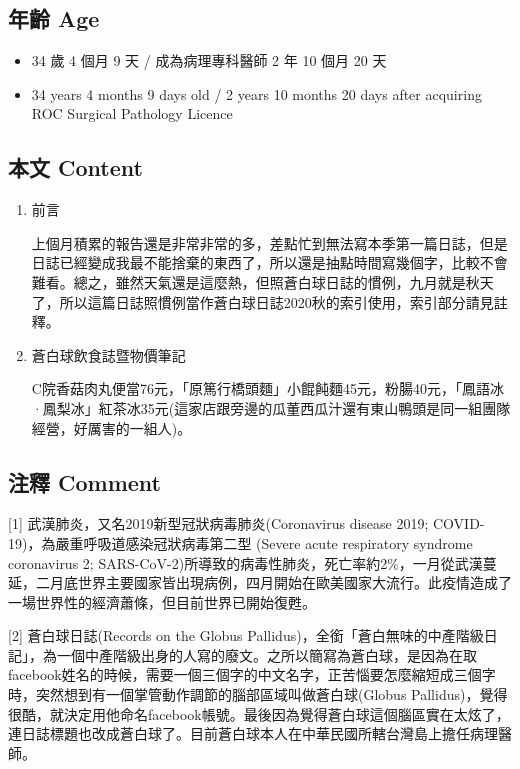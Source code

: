 \documentclass[a5paper, 11pt
]{book}
\providecommand{\tightlist}{%
  \setlength{\itemsep}{0pt}\setlength{\parskip}{0pt}}
\begin{document}
\hypertarget{ux5e74ux9f61-age}{%
\subsection{年齡 Age}\label{ux5e74ux9f61-age}}

\begin{itemize}
\tightlist
\item
  34 歲 4 個月 9 天 / 成為病理專科醫師 2 年 10 個月 20 天
\item
  34 years 4 months 9 days old / 2 years 10 months 20 days after
  acquiring ROC Surgical Pathology Licence
\end{itemize}

\hypertarget{ux672cux6587-content}{%
\subsection{本文 Content}\label{ux672cux6587-content}}

\begin{enumerate}
\def\labelenumi{\arabic{enumi}.}
\item
  前言

  上個月積累的報告還是非常非常的多，差點忙到無法寫本季第一篇日誌，但是日誌已經變成我最不能捨棄的東西了，所以還是抽點時間寫幾個字，比較不會難看。總之，雖然天氣還是這麼熱，但照蒼白球日誌的慣例，九月就是秋天了，所以這篇日誌照慣例當作蒼白球日誌2020秋的索引使用，索引部分請見註釋。
\item
  蒼白球飲食誌暨物價筆記

  C院香菇肉丸便當76元，「原篤行橋頭麵」小餛飩麵45元，粉腸40元，「鳳語冰·鳳梨冰」紅茶冰35元(這家店跟旁邊的瓜董西瓜汁還有東山鴨頭是同一組團隊經營，好厲害的一組人)。
\end{enumerate}

\hypertarget{ux6ce8ux91cb-comment}{%
\subsection{注釋 Comment}\label{ux6ce8ux91cb-comment}}

{[}1{]} 武漢肺炎，又名2019新型冠狀病毒肺炎(Coronavirus disease 2019;
COVID-19)，為嚴重呼吸道感染冠狀病毒第二型 (Severe acute respiratory
syndrome coronavirus 2;
SARS-CoV-2)所導致的病毒性肺炎，死亡率約2\%，一月從武漢蔓延，二月底世界主要國家皆出現病例，四月開始在歐美國家大流行。此疫情造成了一場世界性的經濟蕭條，但目前世界已開始復甦。

{[}2{]} 蒼白球日誌(Records on the Globus
Pallidus)，全銜「蒼白無味的中產階級日記」，為一個中產階級出身的人寫的廢文。之所以簡寫為蒼白球，是因為在取facebook姓名的時候，需要一個三個字的中文名字，正苦惱要怎麼縮短成三個字時，突然想到有一個掌管動作調節的腦部區域叫做蒼白球(Globus
Pallidus)，覺得很酷，就決定用他命名facebook帳號。最後因為覺得蒼白球這個腦區實在太炫了，連日誌標題也改成蒼白球了。目前蒼白球本人在中華民國所轄台灣島上擔任病理醫師。
\end{document}
